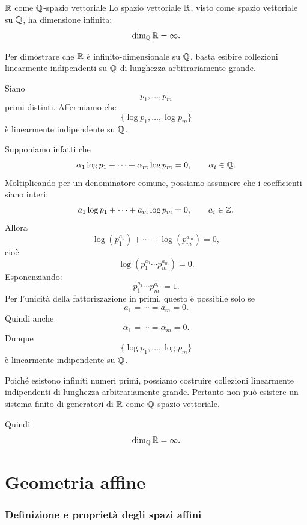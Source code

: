 \documentclass[a4paper]{article}
\begin{document}
\begin{snippetproposition}{\(\mathbb{R}\) come \(\mathbb{Q}\)-spazio vettoriale}
    Lo spazio vettoriale \(\mathbb{R}\), visto come spazio vettoriale su \(\mathbb{Q}\), ha dimensione infinita:
    \[
        \dim_{\mathbb{Q}}\mathbb{R}=\infty.
    \]
\end{snippetproposition}

\begin{snippetproof}{}
    Per dimostrare che \(\mathbb{R}\) è infinito-dimensionale su \(\mathbb{Q}\), basta esibire collezioni linearmente indipendenti su \(\mathbb{Q}\) di lunghezza arbitrariamente grande.

    Siano
    \[
        p_1,\ldots,p_m
    \]
    primi distinti. Affermiamo che
    \[
        \{\log p_1,\ldots,\log p_m\}
    \]
    è linearmente indipendente su \(\mathbb{Q}\).

    Supponiamo infatti che
    \[
        \alpha_1\log p_1+\cdots+\alpha_m\log p_m=0,
        \qquad
        \alpha_i\in\mathbb{Q}.
    \]
    Moltiplicando per un denominatore comune, possiamo assumere che i coefficienti siano interi:
    \[
        a_1\log p_1+\cdots+a_m\log p_m=0,
        \qquad
        a_i\in\mathbb{Z}.
    \]
    Allora
    \[
        \log(p_1^{a_1})+\cdots+\log(p_m^{a_m})=0,
    \]
    cioè
    \[
        \log(p_1^{a_1}\cdots p_m^{a_m})=0.
    \]
    Esponenziando:
    \[
        p_1^{a_1}\cdots p_m^{a_m}=1.
    \]
    Per l'unicità della fattorizzazione in primi, questo è possibile solo se
    \[
        a_1=\cdots=a_m=0.
    \]
    Quindi anche
    \[
        \alpha_1=\cdots=\alpha_m=0.
    \]
    Dunque
    \[
        \{\log p_1,\ldots,\log p_m\}
    \]
    è linearmente indipendente su \(\mathbb{Q}\).

    Poiché esistono infiniti numeri primi, possiamo costruire collezioni linearmente indipendenti di lunghezza arbitrariamente grande. Pertanto non può esistere un sistema finito di generatori di \(\mathbb{R}\) come \(\mathbb{Q}\)-spazio vettoriale.

    Quindi
    \[
        \dim_{\mathbb{Q}}\mathbb{R}=\infty.
    \]
\end{snippetproof}

\part{Geometria affine}

\section{Definizione e proprietà degli spazi affini}
\end{document}
